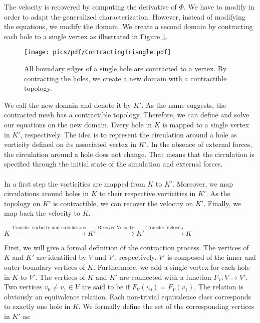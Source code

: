 The velocity is recovered by computing the derivative of $\Phi$.
We have to modify  in order to adapt the generalized characterization.
However, instead of modifying the equations, we modify the domain. 
We create a second domain by contracting each hole to a single vertex as illustrated in Figure \ref{fig:ContractingTriangle}.

\begin{figure}[h!]
\centering
\texttt{[image: pics/pdf/ContractingTriangle.pdf]}
\caption[Contracting a triangle]
		{All boundary edges of a single hole are contracted to a vertex.
		      By contracting the holes, we create a new domain with a contractible topology.}
\label{fig:ContractingTriangle}
\end{figure}

We call the new domain  and denote it by $K'$.
As the name suggests, the contracted mesh has a contractible topology. 
Therefore, we can define and solve our equations on the new domain.
Every hole in $K$ is mapped to a single vertex in $K'$, respectively. 
The idea is to represent the circulation around a hole as vorticity defined on its associated vertex in $K'$.
In the absence of external forces, the circulation around a hole does not change.
That means that the circulation is specified through the initial state of the simulation and external forces.

\paragraph*{}
In a first step the vorticities are mapped from $K$ to $K'$.
Moreover, we map circulations around holes in $K$ to their respective vorticities in $K'$.
As the topology on $K'$ is contractible, we can recover the velocity on $K'$.
Finally, we map back the velocity to $K$.
\begin{center}
$K \xrightarrow{\text{Transfer vorticity and circulations}} K' \xrightarrow{\text{Recover Velocity}}K' \xrightarrow{\text{Transfer Velocity}} K$
\end{center}

First, we will give a formal definition of the contraction process.
The vertices of $K$ and $K'$ are identified by $V$ and $V'$, respectively.
$V'$ is composed of the inner and outer boundary vertices of $K$.
Furthermore, we add a single vertex for each hole in $K$ to $V'$.
The vertices of $K$ and $K'$ are connected with a function $F_V : V \rightarrow V'$.
Two vertices $v_0 \neq v_1 \in V$ are said to be  if
$F_V(v_0) = F_V(v_1)$.
The  relation is obviously an equivalence relation.
Each non-trivial equivalence class corresponds to exactly one hole in $K$.
We formally define the set of the corresponding vertices in $K'$ as:

